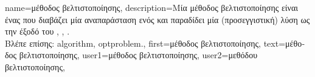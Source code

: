 {name={\foreignlanguage{greek}{μέθοδος βελτιστοποίησης}},
	description={\foreignlanguage{greek}{Μία μέθοδος βελτιστοποίησης είναι ένας} 
		 \foreignlanguage{greek}{που διαβάζει μία αναπαράσταση ενός}  
		\foreignlanguage{greek}{και παραδίδει μία (προσεγγιστική) λύση ως την έξοδό του} 
		\cite{BertsekasNonLinProgr}, \cite{BoydConvexBook}, \cite{nesterov04}. \\
		\foreignlanguage{greek}{Βλέπε επίσης:} \gls{algorithm}, \gls{optproblem}.},
	first={\foreignlanguage{greek}{μέθοδος βελτιστοποίησης}},
	text={\foreignlanguage{greek}{μέθοδος βελτιστοποίησης}},
	user1={\foreignlanguage{greek}{μέθοδος βελτιστοποίησης}}, %
	user2={\foreignlanguage{greek}{μεθόδου βελτιστοποίησης}}, %
}

